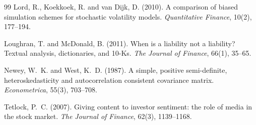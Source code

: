 \documentclass[11pt,a4paper]{article}
\begin{document}
\begin{thebibliography}{99}
Lord, R., Koekkoek, R. and van Dijk, D. (2010). A comparison of biased
simulation schemes for stochastic volatility models. \emph{Quantitative
Finance}, 10(2), 177--194.

Loughran, T. and McDonald, B. (2011). When is a liability not a liability?
Textual analysis, dictionaries, and 10-Ks. \emph{The Journal of Finance}, 66(1),
35--65.

Newey, W.~K. and West, K.~D. (1987). A simple, positive semi-definite,
heteroskedasticity and autocorrelation consistent covariance matrix.
\emph{Econometrica}, 55(3), 703--708.

Tetlock, P.~C. (2007). Giving content to investor sentiment: the role of media
in the stock market. \emph{The Journal of Finance}, 62(3), 1139--1168.

\end{thebibliography}
\end{document}
